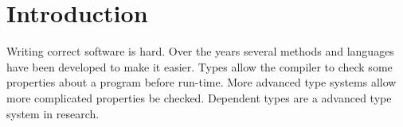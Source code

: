 \documentclass[parskip=half]{scrartcl}
\begin{document}

%
%
%






\section{Introduction}


Writing correct software is hard. Over the years several methods and languages
have been developed to make it easier. Types allow the compiler to check some
properties about a program before run-time. More advanced type systems allow
more complicated properties be checked. Dependent types are a advanced type
system in research.
\end{document}
